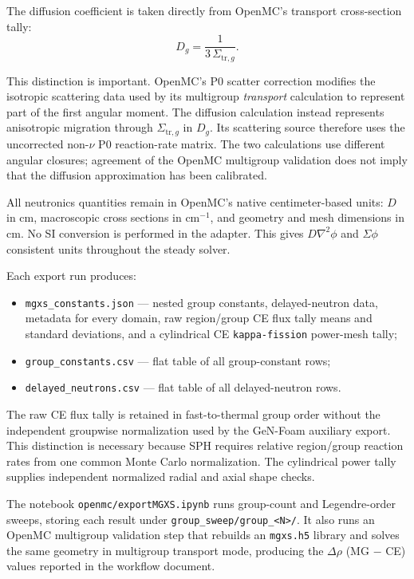 \documentclass[11pt]{article}
\begin{document}
The diffusion coefficient is taken directly from OpenMC's transport
cross-section tally:
\[
D_g = \frac{1}{3\,\Sigma_{\mathrm{tr},g}} .
\]

This distinction is important.  OpenMC's P0 scatter correction modifies the
isotropic scattering data used by its multigroup \emph{transport} calculation
to represent part of the first angular moment.  The diffusion calculation
instead represents anisotropic migration through $\Sigma_{\mathrm{tr},g}$ in
$D_g$.  Its scattering source therefore uses the uncorrected non-$\nu$ P0
reaction-rate matrix.  The two calculations use different angular closures;
agreement of the OpenMC multigroup validation does not imply that the
diffusion approximation has been calibrated.

All neutronics quantities remain in OpenMC's native centimeter-based units:
$D$ in cm, macroscopic cross sections in cm$^{-1}$, and geometry and mesh
dimensions in cm.  No SI conversion is performed in the adapter.  This gives
$D\nabla^2\phi$ and $\Sigma\phi$ consistent units throughout the steady
solver.

Each export run produces:
\begin{itemize}
  \item \texttt{mgxs\_constants.json} --- nested group constants, delayed-neutron
        data, metadata for every domain, raw region/group CE flux tally means
        and standard deviations, and a cylindrical CE
        \texttt{kappa-fission} power-mesh tally;
  \item \texttt{group\_constants.csv} --- flat table of all group-constant rows;
  \item \texttt{delayed\_neutrons.csv} --- flat table of all delayed-neutron rows.
\end{itemize}

The raw CE flux tally is retained in fast-to-thermal group order without the
independent groupwise normalization used by the GeN-Foam auxiliary export.
This distinction is necessary because SPH requires relative region/group
reaction rates from one common Monte Carlo normalization.  The cylindrical
power tally supplies independent normalized radial and axial shape checks.

The notebook \texttt{openmc/exportMGXS.ipynb} runs group-count and
Legendre-order sweeps, storing each result under
\texttt{group\_sweep/group\_<N>/}.  It also runs an OpenMC multigroup
validation step that rebuilds an \texttt{mgxs.h5} library and solves the same
geometry in multigroup transport mode, producing the $\Delta\rho$ (MG $-$ CE)
values reported in the workflow document.
\end{document}
